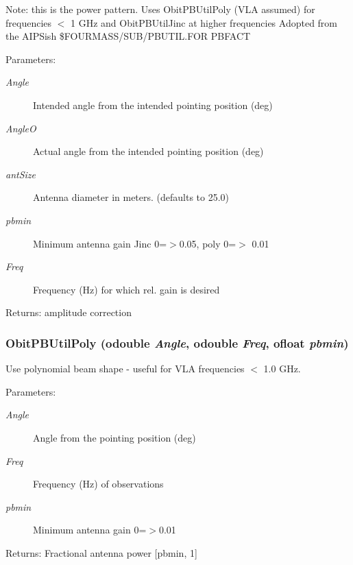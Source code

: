 Note: this is the power pattern. Uses Obit\-PBUtil\-Poly (VLA assumed) for frequencies $<$ 1 GHz and Obit\-PBUtil\-Jinc at higher frequencies Adopted from the AIPSish \$FOURMASS/SUB/PBUTIL.FOR PBFACT \begin{Desc}
\item[Parameters:]
\begin{description}
\item[{\em Angle}]Intended angle from the intended pointing position (deg) \item[{\em Angle\-O}]Actual angle from the intended pointing position (deg) \item[{\em ant\-Size}]Antenna diameter in meters. (defaults to 25.0) \item[{\em pbmin}]Minimum antenna gain Jinc 0=$>$0.05, poly 0=$>$ 0.01 \item[{\em Freq}]Frequency (Hz) for which rel. gain is desired \end{description}
\end{Desc}
\begin{Desc}
\item[Returns:]amplitude correction \end{Desc}
\subsubsection{ Obit\-PBUtil\-Poly ({\bf odouble} {\em Angle}, {\bf odouble} {\em Freq}, {\bf ofloat} {\em pbmin})}\label{ObitPBUtil_8h_a0}


Use polynomial beam shape - useful for VLA frequencies $<$ 1.0 GHz. 

\begin{Desc}
\item[Parameters:]
\begin{description}
\item[{\em Angle}]Angle from the pointing position (deg) \item[{\em Freq}]Frequency (Hz) of observations \item[{\em pbmin}]Minimum antenna gain 0=$>$0.01 \end{description}
\end{Desc}
\begin{Desc}
\item[Returns:]Fractional antenna power [pbmin, 1] \end{Desc}
